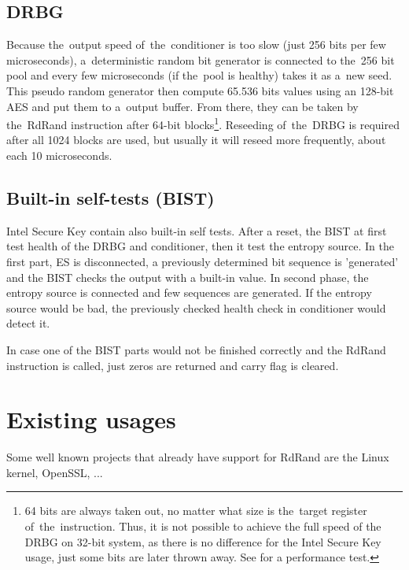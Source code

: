 \subsection{DRBG}\label{subsec:DRBG}
Because the~output speed of~the~conditioner is too slow (just 256 bits per few microseconds), a~deterministic random bit generator is connected to the~256 bit pool and every few microseconds (if the~pool is healthy) takes it as a~new seed. This pseudo random generator then compute 65.536 bits values using an 128-bit AES and put them to a~output buffer. From there, they can be taken by the~RdRand instruction after 64-bit blocks\footnote{64 bits are always taken out, no matter what size is the~target register of~the~instruction. Thus, it is not possible to achieve the full speed of the DRBG on 32-bit system, as there is no difference for the Intel Secure Key usage, just some bits are later thrown away. See  for a performance test.}\cite{AnalysisOfDRNG}\cite{UnderstandingRdRandElectronic}. Reseeding of~the~DRBG is required after all 1024 blocks are used, but usually it will reseed more frequently, about each 10 microseconds.

\subsection{Built-in self-tests (BIST)}
Intel Secure Key contain also built-in self tests. After a reset, the BIST at first test health of the DRBG and conditioner, then it test the entropy source. In the first part, ES is disconnected, a previously determined bit sequence is 'generated' and the BIST checks the output with a built-in value. In second phase, the entropy source is connected and few sequences are generated. If the entropy source would be bad, the previously checked health check in conditioner would detect it. 

In case one of the BIST parts would not be finished correctly and the RdRand instruction is called, just zeros are returned and carry flag is cleared\cite{AnalysisOfDRNG}.

\section{Existing usages} 
Some well known projects that already have support for RdRand are the Linux kernel, OpenSSL, ...


